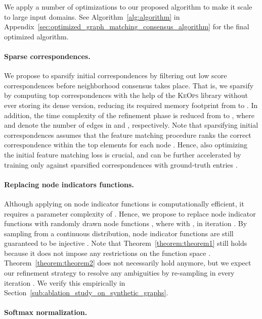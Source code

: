 \documentclass{article}
\begin{document}
We apply a number of optimizations to our proposed algorithm to make it scale to large input domains.
See Algorithm~\ref{alg:algorithm} in Appendix~\ref{sec:optimized_graph_matching_consensus_algorithm} for the final optimized algorithm.

\paragraph{Sparse correspondences.}

We propose to sparsify initial correspondences  by filtering out low score correspondences before neighborhood consensus takes place.
That is, we sparsify  by computing top  correspondences with the help of the \textsc{KeOps} library \citep{Charlier/etal/2019} without ever storing its dense version, reducing its required memory footprint from  to .
In addition, the time complexity of the refinement phase is reduced from  to , where  and  denote the number of edges in  and , respectively.
Note that sparsifying initial correspondences assumes that the feature matching procedure ranks the correct correspondence within the top  elements for each node .
Hence, also optimizing the initial feature matching loss  is crucial, and can be further accelerated by training only against sparsified correspondences with ground-truth entries .

\paragraph{Replacing node indicators functions.}

Although applying  on node indicator functions  is computationally efficient, it requires a parameter complexity of .
Hence, we propose to replace node indicator functions  with randomly drawn node functions , where  with , in iteration .
By sampling from a continuous distribution, node indicator functions are still guaranteed to be injective \citep{DeGroot/Schervish/2012}.
Note that Theorem~\ref{theorem:theorem1} still holds because it does not impose any restrictions on the function space .
Theorem~\ref{theorem:theorem2} does not necessarily hold anymore, but we expect our refinement strategy to resolve any ambiguities by re-sampling  in every iteration .
We verify this empirically in Section~\ref{sub:ablation_study_on_synthetic_graphs}.

\paragraph{Softmax normalization.}
\end{document}
